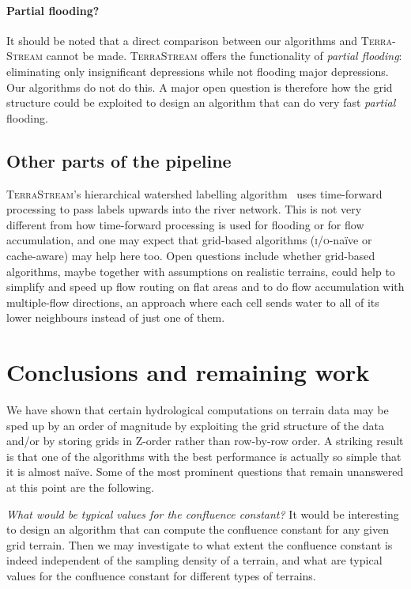 \documentclass[10pt,a4paper]{article}
\def\io{\textsc{i/o}\xspace}
\def\tsm{\textsc{TerraStream}\xspace}
\begin{document}
\paragraph{Partial flooding?}
It should be noted that a direct comparison between our algorithms and \textsc{Terra-Stream} cannot be made. \tsm offers the functionality of \emph{partial flooding}: eliminating only insignificant depressions while not flooding major depressions. Our algorithms do not do this. A major open question is therefore how the grid structure could be exploited to design an algorithm that can do very fast \emph{partial} flooding.

\subsection{Other parts of the pipeline}
\tsm's hierarchical watershed labelling algorithm~\cite{pfafstetter,terrastream} uses time-forward processing to pass labels upwards into the river network. This is not very different from how time-forward processing is used for flooding or for flow accumulation, and one may expect that grid-based algorithms (\io-na\"ive or cache-aware) may help here too. Open questions include whether grid-based algorithms, maybe together with assumptions on realistic terrains, could help to simplify and speed up flow routing on flat areas and to do flow accumulation with multiple-flow directions, an approach where each cell sends water to all of its lower neighbours instead of just one of them.

\section{Conclusions and remaining work}
We have shown that certain hydrological computations on terrain data may be sped up by an order of magnitude by exploiting the grid structure of the data and/or by storing grids in Z-order rather than row-by-row order. A striking result is that one of the algorithms with the best performance is actually so simple that it is almost na\"ive. Some of the most prominent questions that remain unanswered at this point are the following.

\emph{What would be typical values for the confluence constant?}
It would be interesting to design an algorithm that can compute the confluence constant for any given grid terrain. Then we may investigate to what extent the confluence constant is indeed independent of the sampling density of a terrain, and what are typical values for the confluence constant for different types of terrains.
\end{document}
